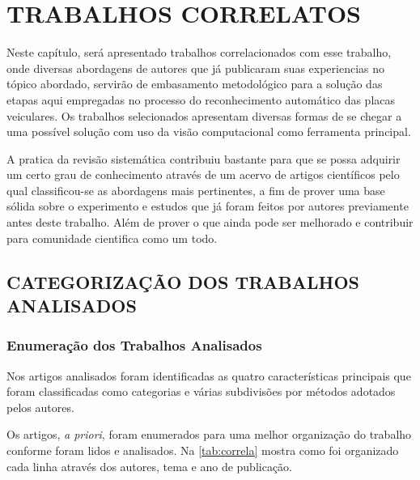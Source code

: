 \chapter{\textbf{\uppercase{Trabalhos Correlatos}}}\label{cap_3}

Neste capítulo, será apresentado trabalhos correlacionados com esse trabalho, onde diversas abordagens de autores que já publicaram suas experiencias no tópico abordado, servirão de embasamento metodológico para a solução das etapas aqui empregadas no processo do reconhecimento automático das placas veiculares. Os trabalhos selecionados apresentam diversas formas de se chegar a uma possível solução com uso da visão computacional como ferramenta principal.

A pratica da revisão sistemática contribuiu bastante para que se possa adquirir um certo grau de conhecimento através de um acervo de artigos científicos pelo qual classificou-se as abordagens mais pertinentes, a fim de prover uma base sólida sobre o experimento e estudos que já foram feitos por autores previamente antes deste trabalho. Além de prover o que ainda pode ser melhorado e contribuir para comunidade cientifica como um todo.

\section{\uppercase{Categorização dos Trabalhos Analisados}}

\subsection{\textbf{Enumeração dos Trabalhos Analisados}}

Nos artigos analisados foram identificadas as quatro características principais que foram classificadas como categorias e várias subdivisões por métodos adotados pelos autores.

Os artigos, \emph{a priori}, foram enumerados para uma melhor organização do trabalho conforme foram lidos e analisados. Na \autoref{tab:correla} mostra como foi organizado cada linha através dos autores, tema e ano de publicação.

